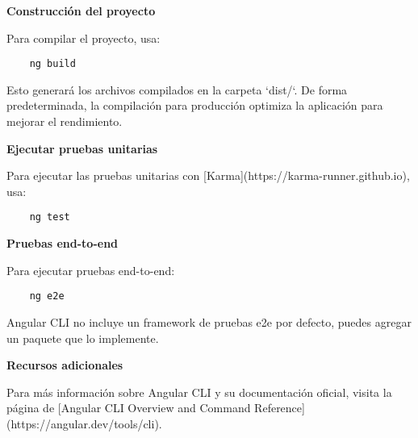 \textbf{Construcción del proyecto}

Para compilar el proyecto, usa:

\begin{verbatim}
    ng build
\end{verbatim}

Esto generará los archivos compilados en la carpeta `dist/`. De forma predeterminada, la compilación para producción optimiza la aplicación para mejorar el rendimiento.

\textbf{Ejecutar pruebas unitarias}

Para ejecutar las pruebas unitarias con [Karma](https://karma-runner.github.io), usa:

\begin{verbatim}
    ng test
\end{verbatim}

\textbf{Pruebas end-to-end}

Para ejecutar pruebas end-to-end:

\begin{verbatim}
    ng e2e
\end{verbatim}

Angular CLI no incluye un framework de pruebas e2e por defecto, puedes agregar un paquete que lo implemente.

\textbf{Recursos adicionales}

Para más información sobre Angular CLI y su documentación oficial, visita la página de [Angular CLI Overview and Command Reference](https://angular.dev/tools/cli).
